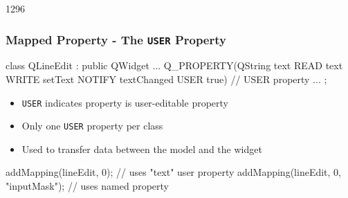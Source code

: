 \begin{slide}[fragile]{1296}\frametitle{Mapped Property - The \texttt{USER} Property}
    \begin{cpp}
class QLineEdit : public QWidget 
{
  ...
  Q_PROPERTY(QString text 
             READ text WRITE setText NOTIFY textChanged 
             USER true) // USER property
  ...
};      
    \end{cpp}
    \begin{itemize}
    \item \texttt{USER} indicates property is user-editable property
    \item Only one \texttt{USER} property per class
    \item Used to transfer data between the model and the widget
    \end{itemize}
    \begin{cpp}
addMapping(lineEdit, 0); // uses "text" user property
addMapping(lineEdit, 0, "inputMask"); // uses named property      
    \end{cpp}
\end{slide}



